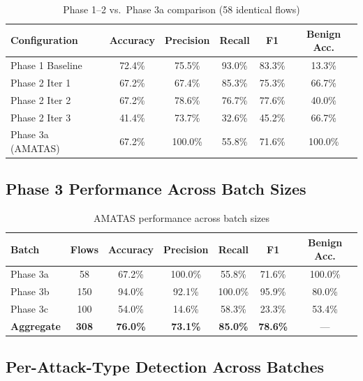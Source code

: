 \documentclass[12pt, a4paper, oneside]{report}
\begin{document}
\begin{table}[H]
\centering
\caption{Phase 1--2 vs.\ Phase 3a comparison (58 identical flows)}
\label{tab:phase3a-comparison}
\begin{tabular}{@{}lccccc@{}}
\toprule
\textbf{Configuration} & \textbf{Accuracy} & \textbf{Precision} & \textbf{Recall}
  & \textbf{F1} & \textbf{Benign Acc.} \\
\midrule
Phase 1 Baseline        & 72.4\% & 75.5\% & 93.0\% & 83.3\% & 13.3\% \\
Phase 2 Iter 1          & 67.2\% & 67.4\% & 85.3\% & 75.3\% & 66.7\% \\
Phase 2 Iter 2          & 67.2\% & 78.6\% & 76.7\% & 77.6\% & 40.0\% \\
Phase 2 Iter 3          & 41.4\% & 73.7\% & 32.6\% & 45.2\% & 66.7\% \\
\midrule
Phase 3a (AMATAS)       & 67.2\% & 100.0\% & 55.8\% & 71.6\% & 100.0\% \\
\bottomrule
\end{tabular}
\end{table}


\subsection{Phase 3 Performance Across Batch Sizes}

\begin{table}[H]
\centering
\caption{AMATAS performance across batch sizes}
\label{tab:phase3-batches}
\begin{tabular}{@{}lcccccc@{}}
\toprule
\textbf{Batch} & \textbf{Flows} & \textbf{Accuracy} & \textbf{Precision}
  & \textbf{Recall} & \textbf{F1} & \textbf{Benign Acc.} \\
\midrule
Phase 3a & 58  & 67.2\% & 100.0\% & 55.8\% & 71.6\% & 100.0\% \\
Phase 3b & 150 & 94.0\% & 92.1\% & 100.0\% & 95.9\% & 80.0\% \\
Phase 3c & 100 & 54.0\% & 14.6\% & 58.3\% & 23.3\% & 53.4\% \\
\midrule
\textbf{Aggregate} & \textbf{308} & \textbf{76.0\%} & \textbf{73.1\%} & \textbf{85.0\%} & \textbf{78.6\%} & --- \\
\bottomrule
\end{tabular}
\end{table}


\subsection{Per-Attack-Type Detection Across Batches}
\end{document}
